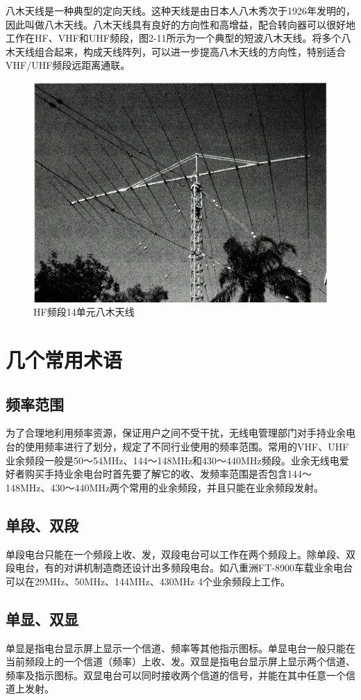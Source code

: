 \documentclass[12pt,UTF8]{ctexbook}
\begin{document}
八木天线是一种典型的定向天线。这种天线是由日本人八木秀次于1926年发明的，因此叫做八木天线。八木天线具有良好的方向性和高增益，配合转向器可以很好地工作在HF、VHF和UHF频段，图2-11所示为一个典型的短波八木天线。将多个八木天线组合起来，构成天线阵列，可以进一步提高八木天线的方向性，特别适合VHF/UHF频段远距离通联。

\begin{figure}[htbp]
	\centering
	\includegraphics[width=0.7\linewidth]{28}
	\caption{HF频段14单元八木天线}
	\label{fig:1}
\end{figure}

\section{几个常用术语}

\subsection{频率范围}
为了合理地利用频率资源，保证用户之间不受干扰，无线电管理部门对手持业余电台的使用频率进行了划分，规定了不同行业使用的频率范围。常用的VHF、UHF业余频段一般是50～54MHz、144～148MHz和430～440MHz频段。业余无线电爱好者购买手持业余电台时首先要了解它的收、发频率范围是否包含144～148MHz、430～440MHz两个常用的业余频段，并且只能在业余频段发射。

\subsection{单段、双段}
单段电台只能在一个频段上收、发，双段电台可以工作在两个频段上。除单段、双段电台，有的对讲机制造商还设计出多频段电台。如八重洲FT-8900车载业余电台可以在29MHz、50MHz、144MHz、430MHz 4个业余频段上工作。

\subsection{单显、双显}
单显是指电台显示屏上显示一个信道、频率等其他指示图标。单显电台一般只能在当前频段上的一个信道（频率）上收、发。双显是指电台显示屏上显示两个信道、频率及指示图标。双显电台可以同时接收两个信道的信号，并能在其中任意一个信道上发射。
\end{document}
